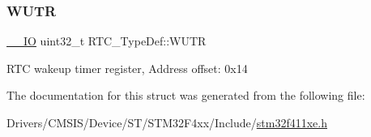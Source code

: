 \subsubsection{\texorpdfstring{W\+U\+TR}{WUTR}}
{\footnotesize\ttfamily \hyperlink{core__sc300_8h_aec43007d9998a0a0e01faede4133d6be}{\+\_\+\+\_\+\+IO} uint32\+\_\+t R\+T\+C\+\_\+\+Type\+Def\+::\+W\+U\+TR}

R\+TC wakeup timer register, Address offset\+: 0x14 

The documentation for this struct was generated from the following file\+:\begin{DoxyCompactItemize}
\item 
Drivers/\+C\+M\+S\+I\+S/\+Device/\+S\+T/\+S\+T\+M32\+F4xx/\+Include/\hyperlink{stm32f411xe_8h}{stm32f411xe.\+h}\end{DoxyCompactItemize}
